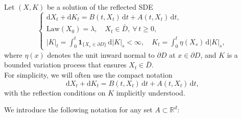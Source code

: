 \documentclass[11pt,amsfonts]{article}
\theoremstyle{plain}
\theoremstyle{assumpstyle}
\numberwithin{equation}{section}
\numberwithin{theorem}{section}
\numberwithin{proposition}{section}
\numberwithin{definition}{section}
\numberwithin{remark}{section}
\numberwithin{corollary}{section}
\numberwithin{lemma}{section}
\begin{document}
Let $(X, K)$ be a solution of the reflected SDE
\begin{equation} 
\label{refl-SDE-sim}
\begin{cases}
\mathrm{d}X_t + \mathrm{d}K_t
= B(t, X_t)\, \mathrm{d}t
+ A(t, X_t)\, \mathrm{d}t
, \\[1.1em]
\mathrm{Law}(X_0) = \lambda, \quad X_t \in \bar{D}, \ \forall\, t \ge 0, \\[0.4em]
|K|_t = \displaystyle\int_0^t \mathbf{1}_{\{ X_s \in \partial D \}}\, \mathrm{d}|K|_s < \infty, 
\quad 
K_t = \displaystyle\int_0^t \eta(X_s)\, \mathrm{d}|K|_s,
\end{cases}
\end{equation}
where $\eta(x)$ denotes the unit inward normal to $\partial D$ at $x \in \partial D$, and $K$ is a bounded variation process that ensures $X_t \in \bar{D}$.\\
For simplicity, we will often use the compact notation
\begin{equation*}
\mathrm{d}X_t+ \mathrm{d}K_t 
= B(t, X_t)\, \mathrm{d}t
+ A(t, X_t)\, \mathrm{d}t
,
\end{equation*}
with the reflection conditions on $K$ implicitly understood.

We introduce the following notation for any set $A \subset \mathbb{R}^d$:
\end{document}
